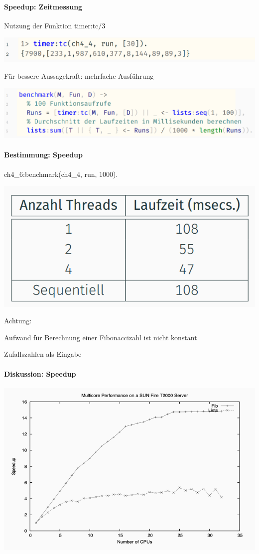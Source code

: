 \documentclass[10pt]{article}
\begin{document}
  \paragraph{Speedup: Zeitmessung}
  
  Nutzung der Funktion timer:tc/3
  \begin{center}
    \includegraphics[width=0.4\linewidth]{Assets/Programmierparadigmen-code-snippet-09}
  \end{center}
  Für bessere Aussagekraft: mehrfache Ausführung
  \begin{center}
    \includegraphics[width=0.4\linewidth]{Assets/Programmierparadigmen-code-snippet-10}
  \end{center}
  
  \paragraph{Bestimmung: Speedup}
  
  ch4\_6:benchmark(ch4\_4, run, 1000).
  \begin{center}
    \includegraphics[width=0.4\linewidth]{Assets/Programmierparadigmen-Speedup-Bestimmung}
  \end{center}
  \color{orange} Achtung: \color{black}
  \begin{itemize*}
    \item Aufwand für Berechnung einer Fibonaccizahl ist nicht konstant
    \item Zufallszahlen als Eingabe
  \end{itemize*}
  
  \paragraph{Diskussion: Speedup}
  
  \begin{center}
    \includegraphics[width=0.4\linewidth]{Assets/Programmierparadigmen-Speedup-Diskussion}
  \end{center}
  
\end{document}
